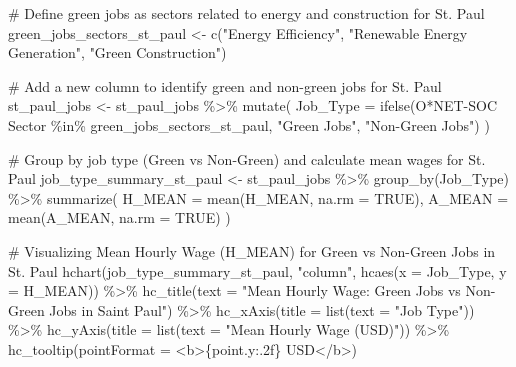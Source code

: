 \documentclass[
  letterpaper,
  DIV=11,
  numbers=noendperiod]{scrartcl}
\newenvironment{Shaded}{\begin{snugshade}}{\end{snugshade}}
\newcommand{\AttributeTok}[1]{\textcolor[rgb]{0.40,0.45,0.13}{#1}}
\newcommand{\CommentTok}[1]{\textcolor[rgb]{0.37,0.37,0.37}{#1}}
\newcommand{\ConstantTok}[1]{\textcolor[rgb]{0.56,0.35,0.01}{#1}}
\newcommand{\FunctionTok}[1]{\textcolor[rgb]{0.28,0.35,0.67}{#1}}
\newcommand{\NormalTok}[1]{\textcolor[rgb]{0.00,0.23,0.31}{#1}}
\newcommand{\OtherTok}[1]{\textcolor[rgb]{0.00,0.23,0.31}{#1}}
\newcommand{\SpecialCharTok}[1]{\textcolor[rgb]{0.37,0.37,0.37}{#1}}
\newcommand{\StringTok}[1]{\textcolor[rgb]{0.13,0.47,0.30}{#1}}
\begin{document}
\begin{Shaded}
\begin{Highlighting}[]
\CommentTok{\# Define green jobs as sectors related to energy and construction for St. Paul}
\NormalTok{green\_jobs\_sectors\_st\_paul }\OtherTok{\textless{}{-}} \FunctionTok{c}\NormalTok{(}\StringTok{"Energy Efficiency"}\NormalTok{, }\StringTok{"Renewable Energy Generation"}\NormalTok{, }\StringTok{"Green Construction"}\NormalTok{)}

\CommentTok{\# Add a new column to identify green and non{-}green jobs for St. Paul}
\NormalTok{st\_paul\_jobs }\OtherTok{\textless{}{-}}\NormalTok{ st\_paul\_jobs }\SpecialCharTok{\%\textgreater{}\%}
  \FunctionTok{mutate}\NormalTok{(}
    \AttributeTok{Job\_Type =} \FunctionTok{ifelse}\NormalTok{(}\StringTok{\textasciigrave{}}\AttributeTok{O*NET{-}SOC Sector}\StringTok{\textasciigrave{}} \SpecialCharTok{\%in\%}\NormalTok{ green\_jobs\_sectors\_st\_paul, }\StringTok{"Green Jobs"}\NormalTok{, }\StringTok{"Non{-}Green Jobs"}\NormalTok{)}
\NormalTok{  )}

\CommentTok{\# Group by job type (Green vs Non{-}Green) and calculate mean wages for St. Paul}
\NormalTok{job\_type\_summary\_st\_paul }\OtherTok{\textless{}{-}}\NormalTok{ st\_paul\_jobs }\SpecialCharTok{\%\textgreater{}\%}
  \FunctionTok{group\_by}\NormalTok{(Job\_Type) }\SpecialCharTok{\%\textgreater{}\%}
  \FunctionTok{summarize}\NormalTok{(}
    \AttributeTok{H\_MEAN =} \FunctionTok{mean}\NormalTok{(H\_MEAN, }\AttributeTok{na.rm =} \ConstantTok{TRUE}\NormalTok{),}
    \AttributeTok{A\_MEAN =} \FunctionTok{mean}\NormalTok{(A\_MEAN, }\AttributeTok{na.rm =} \ConstantTok{TRUE}\NormalTok{)}
\NormalTok{  )}

\CommentTok{\# Visualizing Mean Hourly Wage (H\_MEAN) for Green vs Non{-}Green Jobs in St. Paul}
\FunctionTok{hchart}\NormalTok{(job\_type\_summary\_st\_paul, }\StringTok{"column"}\NormalTok{, }\FunctionTok{hcaes}\NormalTok{(}\AttributeTok{x =}\NormalTok{ Job\_Type, }\AttributeTok{y =}\NormalTok{ H\_MEAN)) }\SpecialCharTok{\%\textgreater{}\%}
  \FunctionTok{hc\_title}\NormalTok{(}\AttributeTok{text =} \StringTok{"Mean Hourly Wage: Green Jobs vs Non{-}Green Jobs in Saint Paul"}\NormalTok{) }\SpecialCharTok{\%\textgreater{}\%}
  \FunctionTok{hc\_xAxis}\NormalTok{(}\AttributeTok{title =} \FunctionTok{list}\NormalTok{(}\AttributeTok{text =} \StringTok{"Job Type"}\NormalTok{)) }\SpecialCharTok{\%\textgreater{}\%}
  \FunctionTok{hc\_yAxis}\NormalTok{(}\AttributeTok{title =} \FunctionTok{list}\NormalTok{(}\AttributeTok{text =} \StringTok{"Mean Hourly Wage (USD)"}\NormalTok{)) }\SpecialCharTok{\%\textgreater{}\%}
  \FunctionTok{hc\_tooltip}\NormalTok{(}\AttributeTok{pointFormat =} \StringTok{\textquotesingle{}\textless{}b\textgreater{}\{point.y:.2f\} USD\textless{}/b\textgreater{}\textquotesingle{}}\NormalTok{)}
\end{Highlighting}
\end{Shaded}
\end{document}
